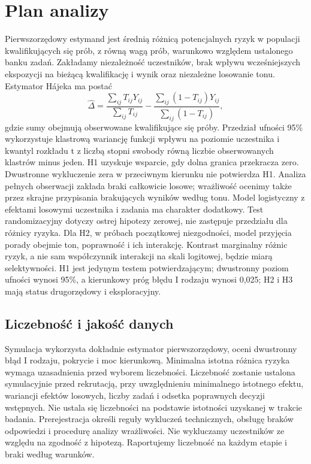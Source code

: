 \documentclass[11pt,a4paper]{article}
\begin{document}
\section{Plan analizy}
Pierwszorzędowy estymand jest średnią różnicą potencjalnych ryzyk w populacji kwalifikujących się prób, z równą wagą prób, warunkowo względem ustalonego banku zadań. Zakładamy niezależność uczestników, brak wpływu wcześniejszych ekspozycji na bieżącą kwalifikację i wynik oraz niezależne losowanie tonu. Estymator Hájeka ma postać
\[
\widehat{\Delta}=
\frac{\sum_{ij}T_{ij}Y_{ij}}{\sum_{ij}T_{ij}}-
\frac{\sum_{ij}(1-T_{ij})Y_{ij}}{\sum_{ij}(1-T_{ij})},
\]
gdzie sumy obejmują obserwowane kwalifikujące się próby. Przedział ufności 95\% wykorzystuje klastrową wariancję funkcji wpływu na poziomie uczestnika i kwantyl rozkładu t z liczbą stopni swobody równą liczbie obserwowanych klastrów minus jeden. H1 uzyskuje wsparcie, gdy dolna granica przekracza zero. Dwustronne wykluczenie zera w przeciwnym kierunku nie potwierdza H1. Analiza pełnych obserwacji zakłada braki całkowicie losowe; wrażliwość ocenimy także przez skrajne przypisania brakujących wyników według tonu. Model logistyczny z efektami losowymi uczestnika i zadania ma charakter dodatkowy. Test randomizacyjny dotyczy ostrej hipotezy zerowej, nie zastępuje przedziału dla różnicy ryzyka. Dla H2, w próbach początkowej niezgodności, model przyjęcia porady obejmie ton, poprawność i ich interakcję. Kontrast marginalny różnic ryzyk, a nie sam współczynnik interakcji na skali logitowej, będzie miarą selektywności. H1 jest jedynym testem potwierdzającym; dwustronny poziom ufności wynosi 95\%, a kierunkowy próg błędu I rodzaju wynosi 0,025; H2 i H3 mają status drugorzędowy i eksploracyjny.
\subsection{Liczebność i jakość danych}
Symulacja wykorzysta dokładnie estymator pierwszorzędowy, oceni dwustronny błąd I rodzaju, pokrycie i moc kierunkową. Minimalna istotna różnica ryzyka wymaga uzasadnienia przed wyborem liczebności. Liczebność zostanie ustalona symulacyjnie przed rekrutacją, przy uwzględnieniu minimalnego istotnego efektu, wariancji efektów losowych, liczby zadań i odsetka poprawnych decyzji wstępnych. Nie ustala się liczebności na podstawie istotności uzyskanej w trakcie badania. Prerejestracja określi reguły wykluczeń technicznych, obsługę braków odpowiedzi i procedurę analizy wrażliwości. Nie wykluczamy uczestników ze względu na zgodność z hipotezą. Raportujemy liczebność na każdym etapie i braki według warunków.
\end{document}
